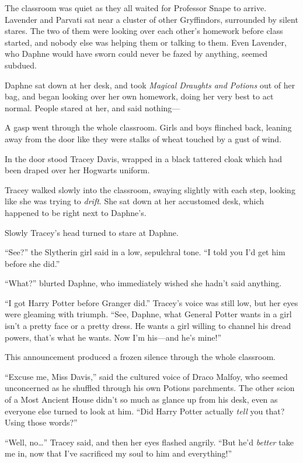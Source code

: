 The classroom was quiet as they all waited for Professor Snape to
arrive. Lavender and Parvati sat near a cluster of other Gryffindors,
surrounded by silent stares. The two of them were looking over each
other's homework before class started, and nobody else was helping them
or talking to them. Even Lavender, who Daphne would have sworn could
never be fazed by anything, seemed subdued.

Daphne sat down at her desk, and took \emph{Magical Draughts and
Potions} out of her bag, and began looking over her own homework, doing
her very best to act normal. People stared at her, and said nothing---

A gasp went through the whole classroom. Girls and boys flinched back,
leaning away from the door like they were stalks of wheat touched by a
gust of wind.

In the door stood Tracey Davis, wrapped in a black tattered cloak which
had been draped over her Hogwarts uniform.

Tracey walked slowly into the classroom, swaying slightly with each
step, looking like she was trying to \emph{drift}. She sat down at her
accustomed desk, which happened to be right next to Daphne's.

Slowly Tracey's head turned to stare at Daphne.

``See?'' the Slytherin girl said in a low, sepulchral tone. ``I told you
I'd get him before she did.''

``What?'' blurted Daphne, who immediately wished she hadn't said
anything.

``I got Harry Potter before Granger did.'' Tracey's voice was still low,
but her eyes were gleaming with triumph. ``See, Daphne, what General
Potter wants in a girl isn't a pretty face or a pretty dress. He wants a
girl willing to channel his dread powers, that's what he wants. Now I'm
his---and he's mine!''

This announcement produced a frozen silence through the whole classroom.

``Excuse me, Miss Davis,'' said the cultured voice of Draco Malfoy, who
seemed unconcerned as he shuffled through his own Potions parchments.
The other scion of a Most Ancient House didn't so much as glance up from
his desk, even as everyone else turned to look at him. ``Did Harry
Potter actually \emph{tell} you that? Using those words?''

``Well, no\ldots{}'' Tracey said, and then her eyes flashed angrily.
``But he'd \emph{better} take me in, now that I've sacrificed my soul to
him and everything!''

